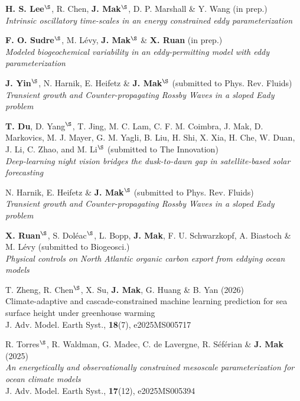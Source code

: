 \documentclass[letterpaper]{article}
\renewenvironment{itemize}{
  \begin{list}{}{
    \setlength{\leftmargin}{1.5em}
  }
}{
  \end{list}
}
\begin{document}
\begin{itemize}
\item[*] \textbf{H. S. Lee}$^{\S}$, R. Chen, \textbf{J. Mak}$^{\S}$, D. P. Marshall \& Y. Wang (in prep.)\\
\textit{Intrinsic oscillatory time-scales in an energy constrained eddy parameterization}

\item[*] \textbf{F. O. Sudre}$^{\S}$, M. L\'evy, \textbf{J. Mak}$^{\S}$ \& \textbf{X. Ruan} (in prep.)\\
\textit{Modeled biogeochemical variability in an eddy-permitting model with eddy parameterization}

\item[*] \textbf{J. Yin}$^{\S}$, N. Harnik, E. Heifetz \& \textbf{J. Mak}$^{\S}$ (submitted to Phys. Rev. Fluids)\\
\textit{Transient growth and Counter-propagating Rossby Waves in a sloped Eady problem}

\item[*] \textbf{T. Du}, D. Yang$^{\S}$, T. Jing, M. C. Lam, C. F. M. Coimbra, J. Mak, D. Markovics, M. J. Mayer, G. M. Yagli, B. Liu, H. Shi, X. Xia, H. Che, W. Duan, J. Li, C. Zhao, and M. Li$^{\S}$ (submitted to The Innovation)\\
\textit{Deep-learning night vision bridges the dusk-to-dawn gap in satellite-based solar forecasting}

N. Harnik, E. Heifetz \& \textbf{J. Mak}$^{\S}$ (submitted to Phys. Rev. Fluids)\\
\textit{Transient growth and Counter-propagating Rossby Waves in a sloped Eady problem}

\item[*] \textbf{X. Ruan}$^{\S}$, S. Dol\'eac$^{\S}$, L. Bopp, \textbf{J. Mak}, F. U. Schwarzkopf, A. Biastoch \& M. L\'evy (submitted to Biogeosci.)\\
\textit{Physical controls on North Atlantic organic carbon export from eddying ocean models}

\item[30.] T. Zheng, R. Chen$^{\S}$, X. Su, \textbf{J. Mak}, G. Huang \& B. Yan (2026)\\
Climate-adaptive and cascade-constrained machine learning prediction for sea surface height under greenhouse warming\\
J. Adv. Model. Earth Syst., \textbf{18}(7), e2025MS005717

\item[29.] R. Torres$^{\S}$, R. Waldman, G. Madec, C. de Lavergne, R. S\'ef\'erian \& \textbf{J. Mak} (2025)\\
\textit{An energetically and observationally constrained mesoscale parameterization for ocean climate models}\\
J. Adv. Model. Earth Syst., \textbf{17}(12), e2025MS005394


\end{itemize}
\end{document}

